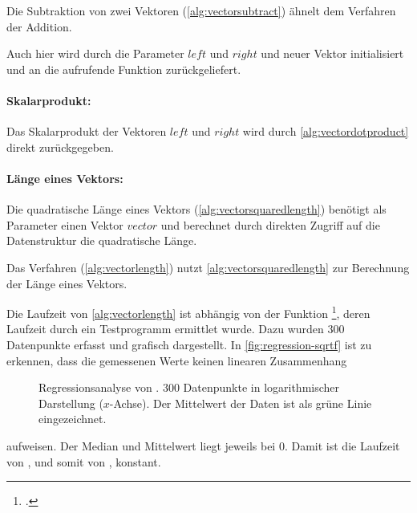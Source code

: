 Die Subtraktion von zwei Vektoren (\autoref{alg:vectorsubtract}) ähnelt dem Verfahren der Addition.

Auch hier wird durch die Parameter $\mathit{left}$ und $\mathit{right}$ und neuer Vektor initialisiert und an die
 aufrufende Funktion zurückgeliefert.


\paragraph{Skalarprodukt:} %
\label{par:skalarprodukt}

Das Skalarprodukt der Vektoren $\mathit{left}$ und $\mathit{right}$ wird durch \autoref{alg:vectordotproduct} direkt
 zurückgegeben.



\paragraph{Länge eines Vektors:} %
\label{par:länge_eines_vektors}

Die quadratische Länge eines Vektors (\autoref{alg:vectorsquaredlength}) benötigt als Parameter einen Vektor
 $\mathit{vector}$ und berechnet durch direkten Zugriff auf die Datenstruktur die quadratische Länge.

Das Verfahren  (\autoref{alg:vectorlength}) nutzt \autoref{alg:vectorsquaredlength} zur Berechnung der
 Länge eines Vektors.

Die Laufzeit von \autoref{alg:vectorlength} ist abhängig von der Funktion \footcite[Vgl.][]{sqrtf},
 deren Laufzeit durch ein Testprogramm ermittlet wurde. Dazu wurden $300$ Datenpunkte erfasst und grafisch dargestellt.
 In \autoref{fig:regression-sqrtf} ist zu erkennen, dass die gemessenen Werte keinen linearen Zusammenhang
\begin{figure}[!ht]
	\centering
	
	\caption{Regressionsanalyse von . $300$ Datenpunkte in logarithmischer Darstellung ($x$-Achse). Der
	 Mittelwert der Daten ist als grüne Linie eingezeichnet.}
	\label{fig:regression-sqrtf}
\end{figure}
 aufweisen. Der Median und Mittelwert liegt jeweils bei $0$. Damit ist die Laufzeit von , und somit von , konstant.

